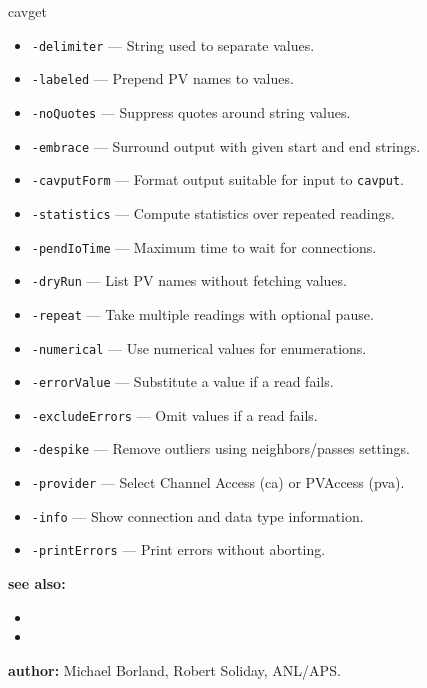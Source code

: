 \begin{sddsprog}{cavget}
\begin{itemize}
  \item {\tt -delimiter} --- String used to separate values.
  \item {\tt -labeled} --- Prepend PV names to values.
  \item {\tt -noQuotes} --- Suppress quotes around string values.
  \item {\tt -embrace} --- Surround output with given start and end strings.
  \item {\tt -cavputForm} --- Format output suitable for input to \verb+cavput+.
  \item {\tt -statistics} --- Compute statistics over repeated readings.
  \item {\tt -pendIoTime} --- Maximum time to wait for connections.
  \item {\tt -dryRun} --- List PV names without fetching values.
  \item {\tt -repeat} --- Take multiple readings with optional pause.
  \item {\tt -numerical} --- Use numerical values for enumerations.
  \item {\tt -errorValue} --- Substitute a value if a read fails.
  \item {\tt -excludeErrors} --- Omit values if a read fails.
  \item {\tt -despike} --- Remove outliers using neighbors/passes settings.
  \item {\tt -provider} --- Select Channel Access (ca) or PVAccess (pva).
  \item {\tt -info} --- Show connection and data type information.
  \item {\tt -printErrors} --- Print errors without aborting.
\end{itemize}
\item \textbf{see also:}
\begin{itemize}
  \item {}
  \item {}
\end{itemize}
\item \textbf{author:} Michael Borland, Robert Soliday, ANL/APS.
\end{sddsprog}

